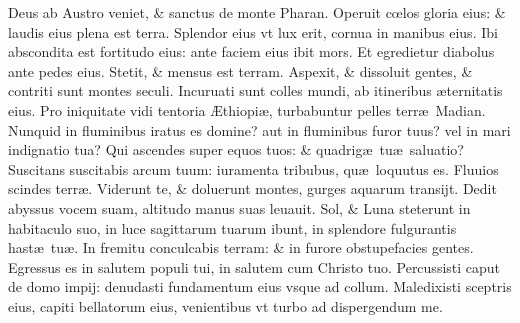 \documentclass[a5paper,10pt]{book}
\def\ae{æ}
\def\AE{Æ}
\def\oe{œ}
\begin{document}
\begin{multicols*}{2}
\newline \color{red} D\color{black}eus ab Austro veniet, \& sanctus de monte Pharan.
\newline \color{red} O\color{black}peruit c\oe los gloria eius: \& laudis eius plena est terra.
\newline \color{red} S\color{black}plendor eius vt lux erit, cornua in manibus eius.
\newline \color{red} I\color{black}bi abscondita est fortitudo eius: ante faciem eius ibit mors.
\newline \color{red} E\color{black}t egredietur diabolus ante pedes eius. Stetit, \& mensus est terram.
\newline \color{red} A\color{black}spexit, \& dissoluit gentes, \& contriti sunt montes seculi.
\newline \color{red} I\color{black}ncuruati sunt colles mundi, ab itineribus \ae ternitatis eius.
\newline \color{red} P\color{black}ro iniquitate vidi tentoria \AE thiopi\ae , turbabuntur pelles terr\ae \ Madian.
\newline \color{red} N\color{black}unquid in fluminibus iratus es domine? aut in fluminibus furor tuus? vel in mari indignatio tua?
\newline \color{red} Q\color{black}ui ascendes super equos tuos: \& quadrig\ae \ tu\ae \ saluatio?
\newline \color{red} S\color{black}uscitans suscitabis arcum tuum: iuramenta tribubus, qu\ae \ loquutus es.
\newline \color{red} F\color{black}luuios scindes terr\ae . Viderunt te, \& doluerunt montes, gurges aquarum transijt.
\newline \color{red} D\color{black}edit abyssus vocem suam, altitudo manus suas leuauit.
\newline \color{red} S\color{black}ol, \& Luna steterunt in habitaculo suo, in luce sagittarum tuarum ibunt, in splendore fulgurantis hast\ae \ tu\ae .
\newline \color{red} I\color{black}n fremitu conculcabis terram: \& in furore obstupefacies gentes.
\newline \color{red} E\color{black}gressus es in salutem populi tui, in salutem cum Christo tuo.
\newline \color{red} P\color{black}ercussisti caput de domo impij: denudasti fundamentum eius vsque ad collum.
\newline \color{red} M\color{black}aledixisti sceptris eius, capiti bellatorum eius, venientibus vt turbo ad dispergendum me.

\end{multicols*}
\end{document}
